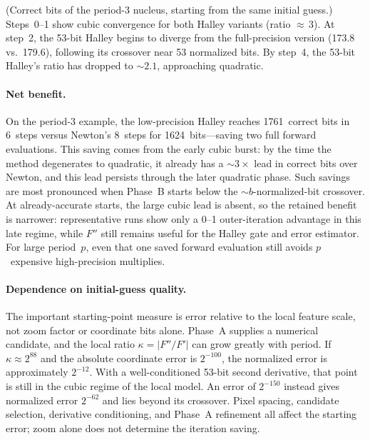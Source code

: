 (Correct bits of the period-3 nucleus, starting from the same initial guess.)
Steps~0--1 show cubic convergence for both Halley variants (ratio
${\approx}\,3$). At step~2, the 53-bit Halley begins to diverge from the
full-precision version (173.8 vs.\ 179.6), following its crossover near
53 normalized bits.  By step~4, the 53-bit Halley's ratio has dropped to
${\sim}2.1$, approaching quadratic.

\paragraph{Net benefit.}
On the period-3 example, the low-precision Halley reaches 1761~correct bits
in 6~steps versus Newton's 8~steps for 1624~bits---saving two full forward
evaluations.  This saving comes from the early cubic burst: by the time the
method degenerates to quadratic, it already has a ${\sim}3\times$ lead in
correct bits over Newton, and this lead persists through the later quadratic
phase.  Such savings are most pronounced when Phase~B starts below the
${\sim}b$-normalized-bit crossover.  At already-accurate starts, the large cubic lead is
absent, so the retained benefit is narrower: representative runs show only a
0--1 outer-iteration advantage in this late regime, while $F''$ still remains
useful for the Halley gate and error estimator.  For large period~$p$, even
that one saved forward evaluation still avoids $p$~expensive
high-precision multiplies.

\paragraph{Dependence on initial-guess quality.}
The important starting-point measure is error relative to the local feature
scale, not zoom factor or coordinate bits alone.  Phase~A supplies a numerical
candidate, and the local ratio $\kappa=|F''/F'|$ can grow greatly with
period.  If $\kappa\approx2^{88}$ and the absolute coordinate error is
$2^{-100}$, the normalized error is approximately $2^{-12}$.
With a well-conditioned 53-bit second derivative, that point is still in
the cubic regime of the local model.  An error of $2^{-150}$ instead gives
normalized error $2^{-62}$ and lies beyond its crossover.  Pixel spacing,
candidate selection, derivative conditioning, and Phase~A refinement all
affect the starting error; zoom alone does not determine the iteration saving.

